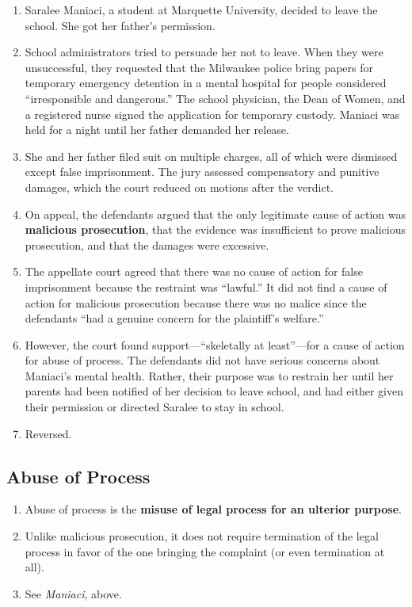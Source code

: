 \begin{enumerate}
    \item Saralee Maniaci, a student at Marquette University, decided to leave 
    the school. She got her father's permission.
    \item School administrators tried to persuade her not to leave. When they 
    were unsuccessful, they requested that the Milwaukee police bring papers 
    for temporary emergency detention in a mental hospital for people 
    considered ``irresponsible and dangerous.'' The school physician, the Dean 
    of Women, and a registered nurse signed the application for temporary 
    custody. Maniaci was held for a night until her father demanded her 
    release.
    \item She and her father filed suit on multiple charges, all of which were 
    dismissed except false imprisonment. The jury assessed compensatory and 
    punitive damages, which the court reduced on motions after the verdict.
    \item On appeal, the defendants argued that the only legitimate cause of 
    action was \textbf{malicious prosecution}, that the evidence was 
    insufficient to prove malicious prosecution, and that the damages were 
    excessive.
    \item The appellate court agreed that there was no cause of action for 
    false imprisonment because the restraint was ``lawful.'' It did not find a 
    cause of action for malicious prosecution because there was no malice 
    since the defendants ``had a genuine concern for the plaintiff's 
    welfare.'' \item However, the court found support---``skeletally at 
    least''---for a cause of action for abuse of process. The defendants did 
    not have serious concerns about Maniaci's mental health. Rather, their 
    purpose was to restrain her until her parents had been notified of her 
    decision to leave school, and had either given their permission or 
    directed Saralee to stay in school.
    \item Reversed. 
\end{enumerate}

\subsection{Abuse of Process}

\begin{enumerate}
    \item Abuse of process is the \textbf{misuse of legal process for an 
    ulterior purpose}.
    \item Unlike malicious prosecution, it does not require termination of the 
    legal process in favor of the one bringing the complaint (or even 
    termination at all).
    \item See \emph{Maniaci}, above.
\end{enumerate}

